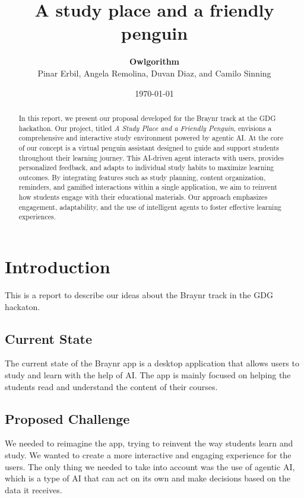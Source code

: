 \documentclass{report}
\title{A study place and a friendly penguin}
\author{\textbf{Owlgorithm} \\ Pinar Erbil, Angela Remolina, Duvan Diaz, and Camilo Sinning}
\date{\today}
\begin{document}
\maketitle

\newpage

\begin{abstract}
In this report, we present our proposal developed for the Braynr track at the GDG hackathon. Our project, titled \textit{A Study Place and a Friendly Penguin}, envisions a comprehensive and interactive study environment powered by agentic AI. At the core of our concept is a virtual penguin assistant designed to guide and support students throughout their learning journey. This AI-driven agent interacts with users, provides personalized feedback, and adapts to individual study habits to maximize learning outcomes. By integrating features such as study planning, content organization, reminders, and gamified interactions within a single application, we aim to reinvent how students engage with their educational materials. Our approach emphasizes engagement, adaptability, and the use of intelligent agents to foster effective learning experiences.
\end{abstract}

\chapter{Introduction}

This is a report to describe our ideas about the Braynr track in the GDG hackaton.

\section{Current State}

The current state of the Braynr app is a desktop application that allows users to study and learn with the help of AI. The app is mainly focused on helping the students read and understand the content of their courses. 

\section{Proposed Challenge}
We needed to reimagine the app, trying to reinvent the way students learn and study. We wanted to create a more interactive and engaging experience for the users. The only thing we needed to take into account was the use of agentic AI, which is a type of AI that can act on its own and make decisions based on the data it receives.
\end{document}
